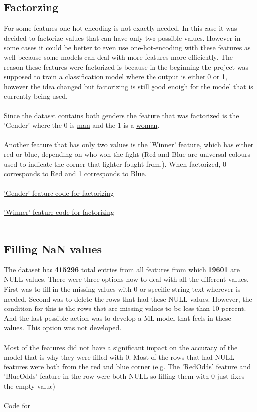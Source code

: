 \documentclass{article}
\begin{document}
  \subsection{Factorzing}
  For some features one-hot-encoding is not exactly needed. In this case it was decided to factorize values that can have only two possible values. However in some cases 
  it could be better to even use one-hot-encoding with these features as well because some models can deal with more features more efficiently. The reason these features were 
  factorized is because in the beginning the project was supposed to train a classification model where the output is either 0 or 1, however the idea changed but factorizing is still 
  good enoigh for the model that is currently being used.\\\\ 
  Since the dataset contains both genders the feature that was factorized is the 'Gender' where the 0 is \underline{man} and the 1 is a \underline{woman}.\\\\
  Another feature that has only two values is the 'Winner' feature, which has either red or blue, depending on who won the fight (Red and Blue are universal colours used to indicate the 
  corner that fighter fought from.). When factorized, 0 corresponds to \underline{Red} and 1 corresponds to \underline{Blue}. \\\\ 
  \href{fig:factorizing_gender}{'Gender' feature code for factorizing}\\\\
  \href{fig: factorizing_winner}{'Winner' feature code for factorizing}\\\\
  \subsection{Filling NaN values}
  The dataset has \textbf{415296} total entries from all features from which \textbf{19601} are NULL values. There were three options how to deal with all the different values. 
  First was to fill in the missing values with 0 or specific string text wherever is needed. Second was to delete the rows that had these NULL values. However, 
  the condition for this is the rows that are missing values to be less than 10 percent. And the last possible action was to develop a ML model that feels in these 
  values. This option was not developed. \\\\ 
  Most of the features did not have a significant impact on the accuracy of the model that is why they were filled with 0. Most of the rows that had NULL features were both from the 
  red and blue corner (e.g. The 'RedOdds' feature and 'BlueOdds' feature in the row were both NULL so filling them with 0 just fixes the empty value)\\\\ 
  Code for 
\end{document}
